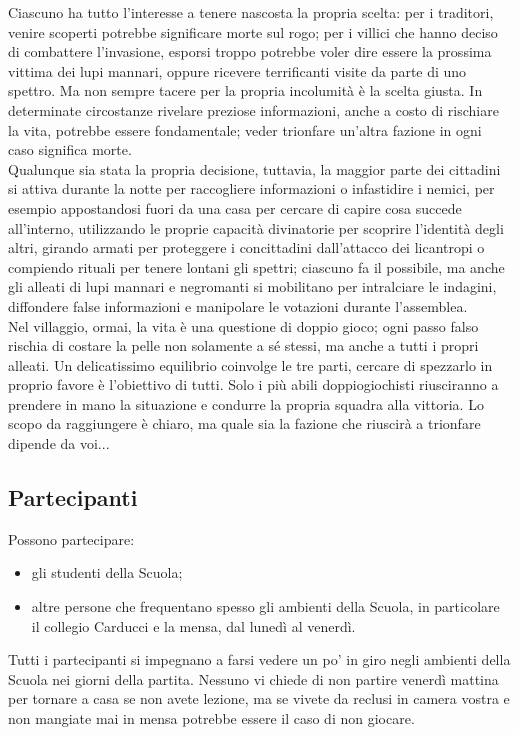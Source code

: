 \documentclass[a4paper,10pt]{article}
\begin{document}
Ciascuno ha tutto l'interesse a tenere nascosta la propria scelta: per i traditori, venire scoperti potrebbe significare morte sul rogo; per i villici che hanno deciso di combattere l'invasione, esporsi troppo potrebbe voler dire essere la prossima vittima dei lupi mannari, oppure ricevere terrificanti visite da parte di uno spettro. Ma non sempre tacere per la propria incolumità è la scelta giusta. In determinate circostanze rivelare preziose informazioni, anche a costo di rischiare la vita, potrebbe essere fondamentale; veder trionfare un'altra fazione in ogni caso significa morte.\\
Qualunque sia stata la propria decisione, tuttavia, la maggior parte dei cittadini si attiva durante la notte per raccogliere informazioni o infastidire i nemici, per esempio appostandosi fuori da una casa per cercare di capire cosa succede all'interno, utilizzando le proprie capacità divinatorie per scoprire l'identità degli altri, girando armati per proteggere i concittadini dall'attacco dei licantropi o compiendo rituali per tenere lontani gli spettri; ciascuno fa il possibile, ma anche gli alleati di lupi mannari e negromanti si mobilitano per intralciare le indagini, diffondere false informazioni e manipolare le votazioni durante l'assemblea.\\ 
Nel villaggio, ormai, la vita è una questione di doppio gioco; ogni passo falso rischia di costare la pelle non solamente a sé stessi, ma anche a tutti i propri alleati. Un delicatissimo equilibrio coinvolge le tre parti, cercare di spezzarlo in proprio favore è l'obiettivo di tutti. Solo i più abili doppiogiochisti riusciranno a prendere in mano la situazione e condurre la propria squadra alla vittoria. Lo scopo da raggiungere è chiaro, ma quale sia la fazione che riuscirà a trionfare dipende da voi...


\subsection{Partecipanti}
Possono partecipare:
\begin{itemize}
 \item gli studenti della Scuola;
 \item altre persone che frequentano spesso gli ambienti della Scuola, in particolare il collegio Carducci e la mensa, dal lunedì al venerdì.
\end{itemize}

Tutti i partecipanti si impegnano a farsi vedere un po' in giro negli ambienti della Scuola nei giorni della partita. Nessuno vi chiede di non partire venerdì mattina per tornare a casa se non avete lezione, ma se vivete da reclusi in camera vostra e non mangiate mai in mensa potrebbe essere il caso di non giocare.
\end{document}
